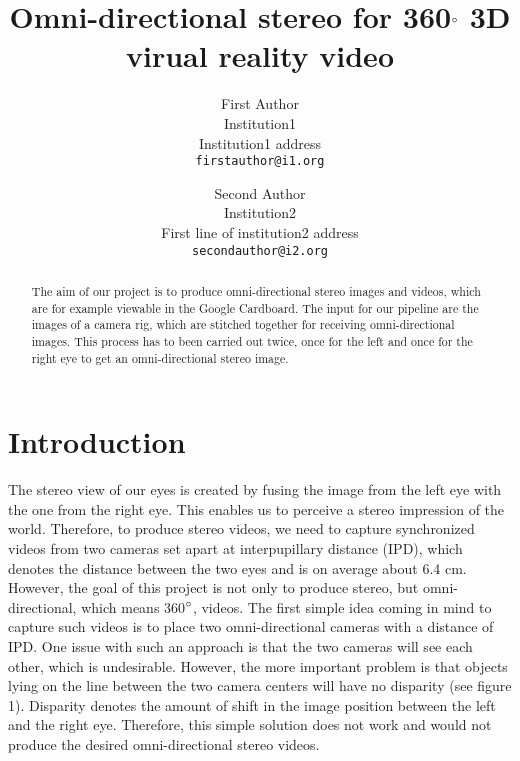 \documentclass[10pt,twocolumn,letterpaper]{article}
\begin{document}
\title{Omni-directional stereo for 360$\degree$ 3D virual reality video}

\author{First Author\\
Institution1\\
Institution1 address\\
{\tt\small firstauthor@i1.org}
\and
Second Author\\
Institution2\\
First line of institution2 address\\
{\tt\small secondauthor@i2.org}
}

\maketitle

\begin{abstract}
   The aim of our project is to produce omni-directional stereo images and videos, which are for example viewable in the Google Cardboard. The input for our pipeline are the images of a camera rig, which are stitched together for receiving omni-directional images. This process has to been carried out twice, once for the left and once for the right eye to get an omni-directional stereo image.
\end{abstract}

\section{Introduction}

The stereo view of our eyes is created by fusing the image from the left eye with the one from the right eye. This enables us to perceive a stereo impression of the world. Therefore, to produce stereo videos, we need to capture synchronized videos from two cameras set apart at interpupillary distance (IPD), which denotes the distance between the two eyes and is on average about 6.4 cm. However, the goal of this project is not only to produce stereo, but omni-directional, which means 360$\degree$, videos. The first simple idea coming in mind to capture such videos is to place two omni-directional cameras with a distance of IPD. One issue with such an approach is that the two cameras will see each other, which is undesirable. However, the more important problem is that objects lying on the line between the two camera centers will have no disparity (see figure 1). Disparity denotes the amount of shift in the image position between the left and the right eye. Therefore, this simple solution does not work and would not produce the desired omni-directional stereo videos.
\end{document}
